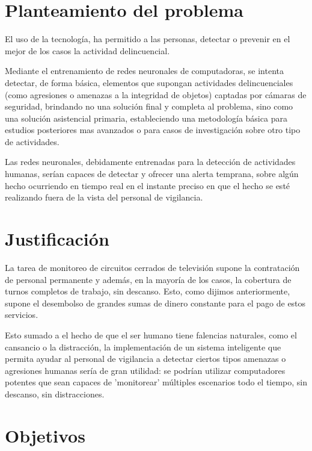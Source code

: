 \documentclass[a4paper,12pt,oneside,spanish]{book}
\begin{document}
\section{Planteamiento del problema}
El uso de la tecnología, ha permitido a las personas, detectar o prevenir en el mejor de los casos la actividad delincuencial.\par

Mediante el entrenamiento de redes neuronales de computadoras, se intenta detectar, de forma básica, elementos que supongan actividades delincuenciales (como agresiones o amenazas a la integridad de objetos) captadas por cámaras de seguridad, brindando no una solución final y completa al problema, sino como una solución asistencial primaria, estableciendo una metodología básica para estudios posteriores mas avanzados o para casos de investigación sobre otro tipo de actividades.
\par

Las redes neuronales, debidamente entrenadas para la detección de actividades humanas, serían capaces de detectar y ofrecer una alerta temprana, sobre algún hecho ocurriendo en tiempo real en el instante preciso en que el hecho se esté realizando fuera de la vista del personal de vigilancia.\par

\section{Justificación}
La tarea de monitoreo de circuitos cerrados de televisión supone la contratación de personal permanente y además, en la mayoría de los casos, la cobertura de  turnos completos de trabajo, sin descanso. Esto, como dijimos anteriormente, supone el desembolso de grandes sumas de dinero constante para el pago de estos servicios.\par

Esto sumado a el hecho de que el ser humano tiene falencias naturales, como el cansancio o la distracción, la implementación de un sistema inteligente que permita ayudar al personal de vigilancia a detectar ciertos tipos amenazas o agresiones humanas sería de gran utilidad: se podrían utilizar computadores potentes que sean capaces de 'monitorear'  múltiples escenarios todo el tiempo, sin descanso, sin distracciones.\par 
 
\section{Objetivos}
\end{document}
